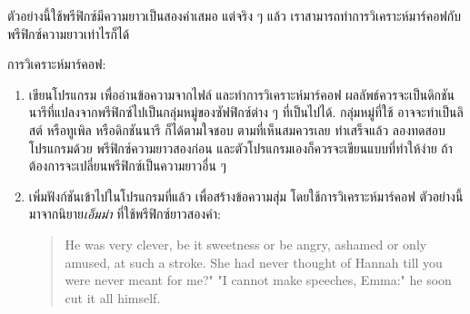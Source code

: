 
ตัวอย่างนี้ใช้พรีฟิกซ์มีความยาวเป็นสองคำเสมอ
แต่จริง ๆ แล้ว เราสามารถทำการวิเคราะห์มาร์คอฟกับพรีฟิกซ์ความยาวเท่าไรก็ได้

\begin{exercise}


การวิเคราะห์มาร์คอฟ:

\begin{enumerate}


\item เขียนโปรแกรม เพื่ออ่านข้อความจากไฟล์ และทำการวิเคราะห์มาร์คอฟ
ผลลัพธ์ควรจะเป็นดิกชันนารีที่แปลงจากพรีฟิกซ์ไปเป็นกลุ่มหมู่ของซัฟฟิกซ์ต่าง ๆ ที่เป็นไปได้.
กลุ่มหมู่ที่ใช้ อาจจะทำเป็นลิสต์ หรือทูเพิล หรือดิกชันนารี ก็ได้ตามใจชอบ ตามที่เห็นสมควรเลย
ทำเสร็จแล้ว ลองทดสอบโปรแกรมด้วย พรีฟิกซ์ความยาวสองก่อน 
และตัวโปรแกรมเองก็ควรจะเขียนแบบที่ทำให้ง่าย ถ้าต้องการจะเปลี่ยนพรีฟิกซ์เป็นความยาวอื่น ๆ


\item เพิ่มฟังก์ชันเข้าไปในโปรแกรมที่แล้ว เพื่อสร้างข้อความสุ่ม โดยใช้การวิเคราะห์มาร์คอฟ
ตัวอย่างนี้มาจากนิยาย\textit{เอ็มม่า} ที่ใช้พรีฟิกซ์ยาวสองคำ:

\begin{quote}
He was very clever, be it sweetness or be angry, ashamed or only
amused, at such a stroke. She had never thought of Hannah till you
were never meant for me?" "I cannot make speeches, Emma:" he soon cut
it all himself.
\end{quote}



\end{enumerate}
\end{exercise}
